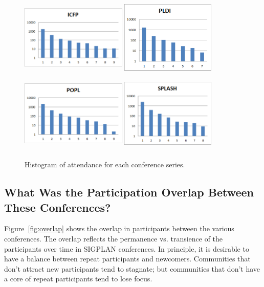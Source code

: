 \begin{figure}
  \centering
  \includegraphics[width=0.45\textwidth,height=1.5in]{figs/AttendanceHistICFP.pdf}
  \includegraphics[width=0.4\textwidth,height=1.5in]{figs/AttendanceHistPLDI.pdf}
  \includegraphics[width=0.45\textwidth,height=1.5in]{figs/AttendanceHistPOPL.pdf}
  \includegraphics[width=0.4\textwidth,height=1.5in]{figs/AttendanceHistSPLASH.pdf}
  \caption{Histogram of attendance for each conference series.}
  \label{fig:hist_attendance_per_conference}
\end{figure}


\subsection{What Was the Participation Overlap Between These Conferences?}

Figure~\ref{fig:overlap} shows the overlap in participants between the various conferences. The overlap reflects the permanence vs. transience of the participants over time in SIGPLAN conferences. In principle, it is desirable to have a balance between repeat participants and newcomers. Communities that don't attract new participants tend to stagnate; but communities that don't have a core of repeat participants tend to lose focus.

